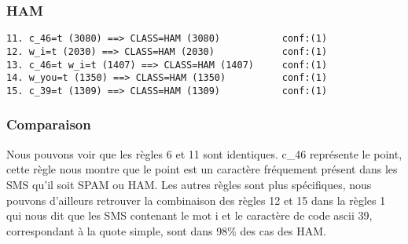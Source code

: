 \subsubsection{HAM}

\begin{verbatim}
11. c_46=t (3080) ==> CLASS=HAM (3080)           conf:(1)
12. w_i=t (2030) ==> CLASS=HAM (2030)            conf:(1)
13. c_46=t w_i=t (1407) ==> CLASS=HAM (1407)     conf:(1)
14. w_you=t (1350) ==> CLASS=HAM (1350)          conf:(1)
15. c_39=t (1309) ==> CLASS=HAM (1309)           conf:(1)
\end{verbatim}

\subsubsection{Comparaison}

Nous pouvons voir que les règles 6 et 11 sont identiques. \og c\_46 \fg{} représente le point, cette règle nous montre que le point est un caractère fréquement présent dans les SMS qu'il soit SPAM ou HAM. Les autres règles sont plus spécifiques, nous pouvons d'ailleurs retrouver la combinaison des règles 12 et 15 dans la règles 1 qui nous dit que les SMS contenant le mot \og i \fg{} et le caractère de code ascii 39, correspondant à la quote simple, sont dans 98\% des cas des HAM.
